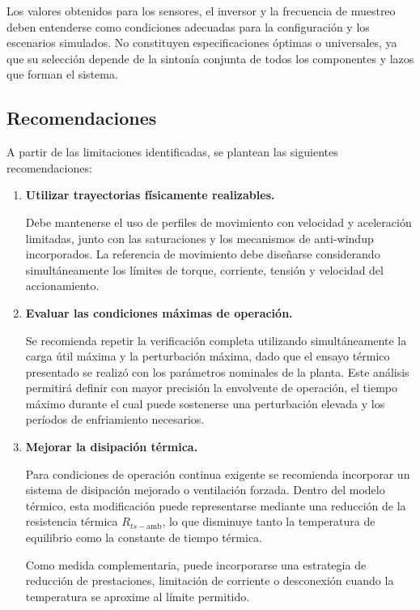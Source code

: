 \documentclass[10pt,a4paper]{article}
\begin{document}
Los valores obtenidos para los sensores, el inversor y la frecuencia de
muestreo deben entenderse como condiciones adecuadas para la configuración y
los escenarios simulados. No constituyen especificaciones óptimas o universales,
ya que su selección depende de la sintonía conjunta de todos los componentes y
lazos que forman el sistema.

\subsection{Recomendaciones}

A partir de las limitaciones identificadas, se plantean las siguientes
recomendaciones:

\begin{enumerate}
	\setlength{\itemsep}{0.8em}
	
	\item \textbf{Utilizar trayectorias físicamente realizables.}
	
	Debe mantenerse el uso de perfiles de movimiento con velocidad y
	aceleración limitadas, junto con las saturaciones y los mecanismos de
	anti-windup incorporados. La referencia de movimiento debe diseñarse
	considerando simultáneamente los límites de torque, corriente, tensión y
	velocidad del accionamiento.
	
	\item \textbf{Evaluar las condiciones máximas de operación.}
	
	Se recomienda repetir la verificación completa utilizando simultáneamente
	la carga útil máxima y la perturbación máxima, dado que el ensayo térmico
	presentado se realizó con los parámetros nominales de la planta. Este
	análisis permitirá definir con mayor precisión la envolvente de operación,
	el tiempo máximo durante el cual puede sostenerse una perturbación elevada
	y los períodos de enfriamiento necesarios.
	
	\item \textbf{Mejorar la disipación térmica.}
	
	Para condiciones de operación continua exigente se recomienda incorporar
	un sistema de disipación mejorado o ventilación forzada. Dentro del modelo
	térmico, esta modificación puede representarse mediante una reducción de la
	resistencia térmica $R_{ts-\mathrm{amb}}$, lo que disminuye tanto la
	temperatura de equilibrio como la constante de tiempo térmica.
	
	Como medida complementaria, puede incorporarse una estrategia de reducción
	de prestaciones, limitación de corriente o desconexión cuando la
	temperatura se aproxime al límite permitido.
	

\end{enumerate}
\end{document}
